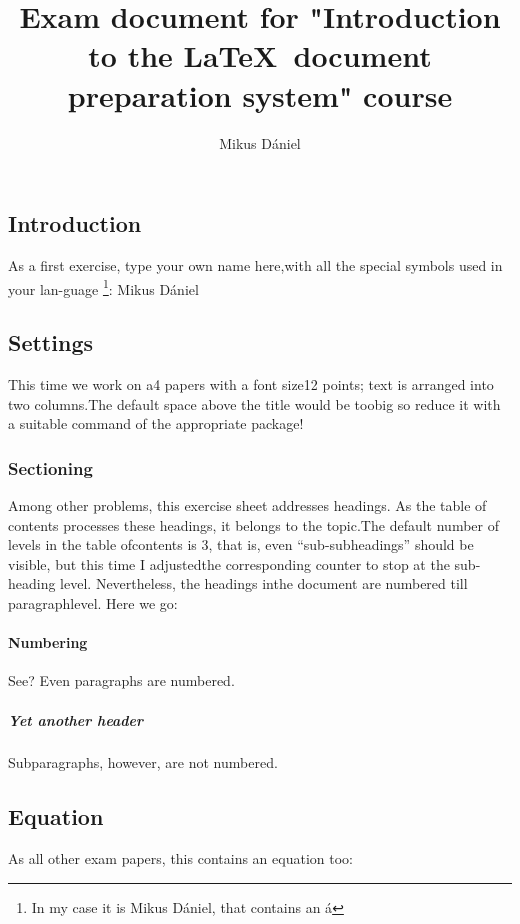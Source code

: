 \documentclass[12pt]{article}
\title{Exam document for "Introduction to the \LaTeX ~document preparation system" course}
\author{Mikus Dániel}
\begin{document}
\maketitle
\begin{multicols}{2}
\section{Introduction}
As a first exercise, type your own name here,with all the special symbols used in your lan-guage \footnote{In my case it is Mikus Dániel, that contains an á}: Mikus Dániel
\subsection{Settings}
This time we work on a4 papers with a font size12 points; text is arranged into two columns.The default space above the title would be toobig so reduce it with a suitable command of the appropriate package!
\subsubsection{Sectioning}
Among other problems, this exercise sheet addresses headings. As the table of contents processes these headings, it belongs to the topic.The default number of levels in the table ofcontents is 3, that is, even “sub-subheadings” should be visible, but this time I adjustedthe corresponding counter to stop at the sub-heading level.  Nevertheless, the headings inthe document are numbered till paragraphlevel. Here we go:
\paragraph{Numbering}
See? Even paragraphs are numbered.
\subparagraph{Yet another header}
Subparagraphs, however, are not numbered.
\subsection{Equation}
As all other exam papers, this contains an equation too:
\tableofcontents
\end{multicols}
\end{document}
